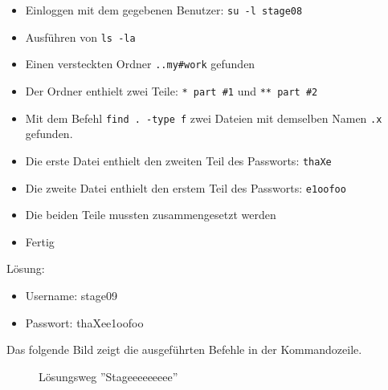 \documentclass[12pt, a4paper, titlepage, oneside]{scrartcl}
\begin{document}
	\begin{itemize}
		\item Einloggen mit dem gegebenen Benutzer: \lstinline{su -l stage08}

		\item Ausführen von \lstinline{ls -la}

		\item Einen versteckten Ordner \lstinline{..my#work} gefunden

		\item Der Ordner enthielt zwei Teile: \lstinline{* part #1} und \lstinline{** part #2}

		\item Mit dem Befehl \lstinline{find . -type f} zwei Dateien mit demselben
			Namen \lstinline{.x} gefunden.

		\item Die erste Datei enthielt den zweiten Teil des Passworts: \lstinline{thaXe}

		\item Die zweite Datei enthielt den erstem Teil des Passworts: \lstinline{e1oofoo}

		\item Die beiden Teile mussten zusammengesetzt werden

		\item Fertig
	\end{itemize}

	Lösung:
	\begin{itemize}
		\item Username: stage09

		\item Passwort: thaXee1oofoo
	\end{itemize}

	Das folgende Bild zeigt die ausgeführten Befehle in der Kommandozeile.

	\begin{figure}[h!]
		\centering
		\caption{Lösungsweg ''Stageeeeeeeee''}
		\label{fig:stageeeeeeeee_solution}
	\end{figure}
\end{document}

